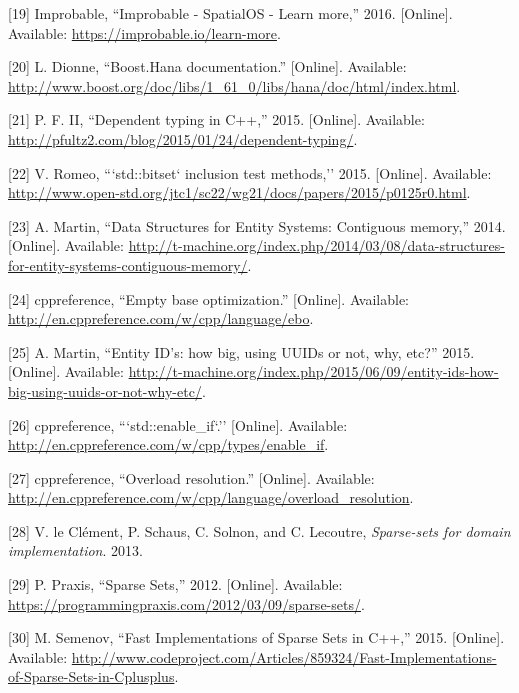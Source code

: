 \documentclass[twoside, 12pt, a4paper, openright]{book}
\begin{document}
\hypertarget{ref-spatialos_learnmore}{}
{[}19{]} Improbable, ``Improbable - SpatialOS - Learn more,'' 2016.
{[}Online{]}. Available: \url{https://improbable.io/learn-more}.

\hypertarget{ref-boosthana}{}
{[}20{]} L. Dionne, ``Boost.Hana documentation.'' {[}Online{]}.
Available:
\url{http://www.boost.org/doc/libs/1_61_0/libs/hana/doc/html/index.html}.

\hypertarget{ref-pfultz2_dependentyping}{}
{[}21{]} P. F. II, ``Dependent typing in C++,'' 2015. {[}Online{]}.
Available: \url{http://pfultz2.com/blog/2015/01/24/dependent-typing/}.

\hypertarget{ref-isocpp_proposal_p0125r0}{}
{[}22{]} V. Romeo, ```std::bitset` inclusion test methods,'' 2015.
{[}Online{]}. Available:
\url{http://www.open-std.org/jtc1/sc22/wg21/docs/papers/2015/p0125r0.html}.

\hypertarget{ref-tmachine_compstorage}{}
{[}23{]} A. Martin, ``Data Structures for Entity Systems: Contiguous
memory,'' 2014. {[}Online{]}. Available:
\url{http://t-machine.org/index.php/2014/03/08/data-structures-for-entity-systems-contiguous-memory/}.

\hypertarget{ref-cppreference_ebo}{}
{[}24{]} cppreference, ``Empty base optimization.'' {[}Online{]}.
Available: \url{http://en.cppreference.com/w/cpp/language/ebo}.

\hypertarget{ref-tmachine_eids}{}
{[}25{]} A. Martin, ``Entity ID's: how big, using UUIDs or not, why,
etc?'' 2015. {[}Online{]}. Available:
\url{http://t-machine.org/index.php/2015/06/09/entity-ids-how-big-using-uuids-or-not-why-etc/}.

\hypertarget{ref-cppreference_enable_if}{}
{[}26{]} cppreference, ```std::enable\_if`.'' {[}Online{]}. Available:
\url{http://en.cppreference.com/w/cpp/types/enable_if}.

\hypertarget{ref-cppreference_overload_resolution}{}
{[}27{]} cppreference, ``Overload resolution.'' {[}Online{]}. Available:
\url{http://en.cppreference.com/w/cpp/language/overload_resolution}.

\hypertarget{ref-sparsesets132}{}
{[}28{]} V. le Clément, P. Schaus, C. Solnon, and C. Lecoutre,
\emph{Sparse-sets for domain implementation}. 2013.

\hypertarget{ref-sparsesets_praxis}{}
{[}29{]} P. Praxis, ``Sparse Sets,'' 2012. {[}Online{]}. Available:
\url{https://programmingpraxis.com/2012/03/09/sparse-sets/}.

\hypertarget{ref-sparsesets_cpp}{}
{[}30{]} M. Semenov, ``Fast Implementations of Sparse Sets in C++,''
2015. {[}Online{]}. Available:
\url{http://www.codeproject.com/Articles/859324/Fast-Implementations-of-Sparse-Sets-in-Cplusplus}.
\end{document}
